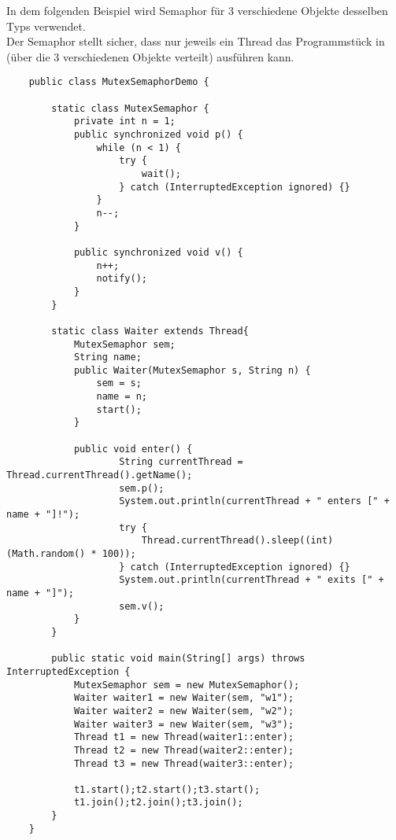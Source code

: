 \noindent
In dem folgenden Beispiel wird  Semaphor für 3 verschiedene Objekte desselben Typs verwendet.\\
Der Semaphor stellt sicher, dass nur jeweils ein Thread das Programmstück in  (über die $3$ verschiedenen Objekte verteilt) ausführen kann. \\


\begin{verbatim}
    public class MutexSemaphorDemo {

        static class MutexSemaphor {
            private int n = 1;
            public synchronized void p() {
                while (n < 1) {
                    try {
                        wait();
                    } catch (InterruptedException ignored) {}
                }
                n--;
            }

            public synchronized void v() {
                n++;
                notify();
            }
        }

        static class Waiter extends Thread{
            MutexSemaphor sem;
            String name;
            public Waiter(MutexSemaphor s, String n) {
                sem = s;
                name = n;
                start();
            }

            public void enter() {
                    String currentThread = Thread.currentThread().getName();
                    sem.p();
                    System.out.println(currentThread + " enters [" + name + "]!");
                    try {
                        Thread.currentThread().sleep((int) (Math.random() * 100));
                    } catch (InterruptedException ignored) {}
                    System.out.println(currentThread + " exits [" + name + "]");
                    sem.v();
            }
        }

        public static void main(String[] args) throws InterruptedException {
            MutexSemaphor sem = new MutexSemaphor();
            Waiter waiter1 = new Waiter(sem, "w1");
            Waiter waiter2 = new Waiter(sem, "w2");
            Waiter waiter3 = new Waiter(sem, "w3");
            Thread t1 = new Thread(waiter1::enter);
            Thread t2 = new Thread(waiter2::enter);
            Thread t3 = new Thread(waiter3::enter);

            t1.start();t2.start();t3.start();
            t1.join();t2.join();t3.join();
        }
    }
\end{verbatim}\\

